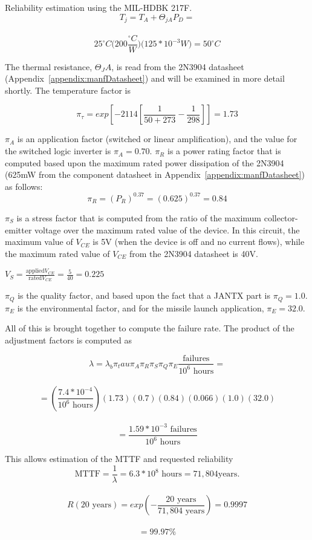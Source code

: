 {\begin{example}{Reliability estimation using the MIL-HDBK 217F.}
$$T_j = T_A + \Theta_{jA}P_D = $$ \\
$$		25^\circ C \big( 200 \frac{^\circ C}{W} \big) \big(125 * 10^{-3}W \big) = 50^\circ C $$

The thermal resistance, $\Theta_JA$, is read
from the 2N3904 datasheet (Appendix~\ref{appendix:manfDatasheet}) and 
will be examined in more
detail shortly. The temperature factor is

$$\pi_\tau = exp [-2114 [ \frac{1}{50 + 273} - \frac{1}{298} ] ] = 1.73$$

$\pi_A$ is an application factor
(switched or linear amplification), and the value for the switched logic
inverter is $\pi_A = 0.70$.  $\pi_R$ is a power rating factor that is
computed based upon the maximum rated power dissipation of the 2N3904
(625mW from the component datasheet in Appendix~\ref{appendix:manfDatasheet}) 
as follows:
$$\pi_R = (P_R)^{0.37} = (0.625)^{0.37} = 0.84$$


$\pi_S$ is a stress factor that is
computed from the ratio of the maximum collector-emitter voltage over
the maximum rated value of the device. In this circuit, the maximum
value of $V_{CE}$ is 5V (when the device
is off and no current flows), while the maximum rated value of
$V_{CE}$ from the 2N3904 datasheet is 40V.

$V_S = \frac{\text{applied} V_{CE}}{\text{rated} V_{CE}} = \frac{5}{40} = 0.225$

$\pi_Q$ is the quality factor, and based upon the fact that a JANTX part is 
$\pi_Q = 1.0$.  $\pi_E$ is the environmental factor, and
for the missile launch application, $\pi_E = 32.0$.

All of this is brought together to compute the failure rate. The product
of the adjustment factors is computed as

$$\lambda=\lambda_b \pi_tau \pi_A \pi_R \pi_S \pi_Q \pi_E \frac{\text{failures}}{10^6 \text{ hours}} = $$\\
$$	= ( \frac{7.4*10^{-4}}{10^6 \text{ hours}}) (1.73)(0.7)(0.84)(0.066)(1.0)(32.0)  $$\\
$$	= \frac{1.59*10^{-3} \text{ failures}}{10^6 \text{ hours}}$$

This allows estimation of the MTTF and requested reliability
$$	\text{MTTF} = \frac{1}{\lambda} = 6.3*10^8 \text{ hours} = 71,804 \text{years}. $$\\
$$	R(20 \text{ years}) = exp ( -\frac{20 \text{ years}}{71,804 \text{ years}} ) = 0.9997 $$\\
$$	= 99.97\%$$


\end{example}}
